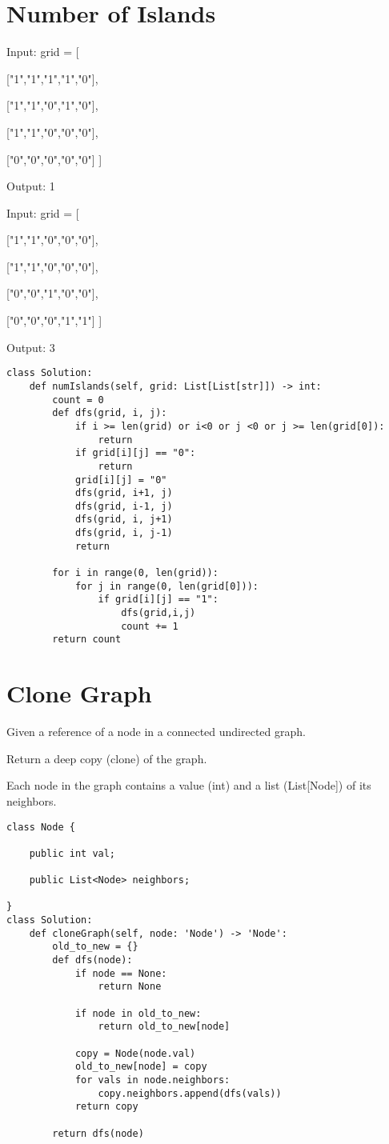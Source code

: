 \documentclass[24pt, a4]{article}
\begin{document}
\section{Number of Islands}
Input: grid = [

  ["1","1","1","1","0"],
  
  ["1","1","0","1","0"],
  
  ["1","1","0","0","0"],
  
  ["0","0","0","0","0"]
]

Output: 1

Input: grid = [

  ["1","1","0","0","0"],

  ["1","1","0","0","0"],

  ["0","0","1","0","0"],

  ["0","0","0","1","1"]
]

Output: 3
\begin{lstlisting}
class Solution:
    def numIslands(self, grid: List[List[str]]) -> int: 
        count = 0
        def dfs(grid, i, j):
            if i >= len(grid) or i<0 or j <0 or j >= len(grid[0]):
                return 
            if grid[i][j] == "0":
                return
            grid[i][j] = "0"
            dfs(grid, i+1, j)
            dfs(grid, i-1, j)
            dfs(grid, i, j+1)
            dfs(grid, i, j-1)
            return
        
        for i in range(0, len(grid)):
            for j in range(0, len(grid[0])):
                if grid[i][j] == "1":
                    dfs(grid,i,j)
                    count += 1
        return count
\end{lstlisting}
\newpage
\section{Clone Graph}
Given a reference of a node in a connected undirected graph.

Return a deep copy (clone) of the graph.

Each node in the graph contains a value (int) and a list (List[Node]) of 
its neighbors.

\begin{lstlisting}
class Node {
    
    public int val;

    public List<Node> neighbors;

}
class Solution:
    def cloneGraph(self, node: 'Node') -> 'Node':
        old_to_new = {}
        def dfs(node):
            if node == None:
                return None
            
            if node in old_to_new:
                return old_to_new[node]
            
            copy = Node(node.val)
            old_to_new[node] = copy
            for vals in node.neighbors:
                copy.neighbors.append(dfs(vals))
            return copy
        
        return dfs(node)
\end{lstlisting}
\newpage
\end{document}
